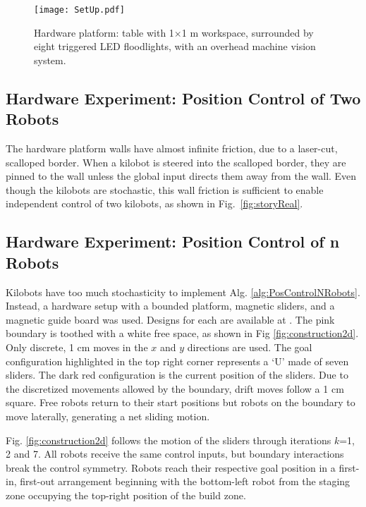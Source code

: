 \begin{figure}
\begin{center}
	\texttt{[image: SetUp.pdf]}
\end{center}
\vspace{-1em}
\caption{\label{fig:setup}
Hardware platform:  table with 1$\times$1 m workspace, surrounded by eight  triggered LED floodlights, with an overhead machine vision system.
}
\vspace{-1em}
\end{figure}
\subsection{Hardware Experiment: Position Control of Two Robots}
The hardware platform walls have almost infinite friction, due to a laser-cut, scalloped border. When a kilobot is steered into the scalloped border, they are pinned to the wall unless the global input directs them away from the wall.  Even though the kilobots are stochastic, this wall friction is sufficient to enable independent control of two kilobots, as shown in Fig.~\ref{fig:storyReal}.

\subsection{Hardware Experiment: Position Control of n Robots}
Kilobots have too much stochasticity to implement Alg. \ref{alg:PosControlNRobots}. Instead, a hardware setup with a bounded platform, magnetic sliders, and a magnetic guide board was used.  Designs for each are available at \citep{Arun2016Thingiverse}. The pink boundary is toothed with a white free space, as shown in Fig \ref{fig:construction2d}. Only discrete, 1 cm moves in the $x$ and $y$ directions are used. The goal configuration highlighted in the top right corner represents a `U' made of seven sliders. The dark red configuration is the current position of the sliders. 
Due to the discretized movements allowed by the boundary, drift moves follow a 1 cm square.  Free robots return to their start positions but robots on the boundary to move laterally, generating a net sliding motion.

Fig. \ref{fig:construction2d} follows the motion of the sliders through iterations  $k$=1, 2 and 7. All robots receive the same control inputs, but boundary interactions break the control symmetry.  Robots reach their respective goal position in a first-in, first-out arrangement beginning with the bottom-left robot from the staging zone occupying the top-right position of the build zone.

